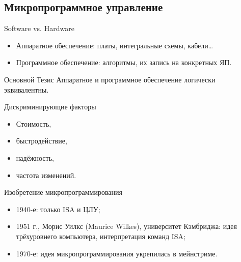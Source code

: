 \subsection{Микропрограммное управление}

\begin{frame}{Software vs. Hardware}
\begin{itemize}\small
\item Аппаратное обеспечение: платы, интегральные схемы, кабели…
\item Программное обеспечение: алгоритмы, их запись на конкретных ЯП.
\end{itemize}

\pause\begin{block}{Основной Тезис}
Аппаратное и программное обеспечение логически эквивалентны.
\end{block}


{\small\pause\begin{block}{Дискриминирующие факторы}
\pause\begin{itemize}
\addtolength{\itemsep}{-0.3\baselineskip}
    \item Стоимость,
    \item быстродействие,
    \item надёжность,
    \item частота изменений.
\end{itemize}
\end{block}}
\end{frame}

\begin{frame}{Изобретение микропрограммирования}
\begin{itemize}
    \item 1940-е: только ISA и ЦЛУ;
    \pause\item 1951 г., Морис Уилкс (Maurice Wilkes), университет Кэмбриджа: идея трёхуровнего компьютера, интерпретация команд ISA;
    \pause\item 1970-е: идея микропрограммирования укрепилась в мейнстриме.
\end{itemize}
\end{frame}

